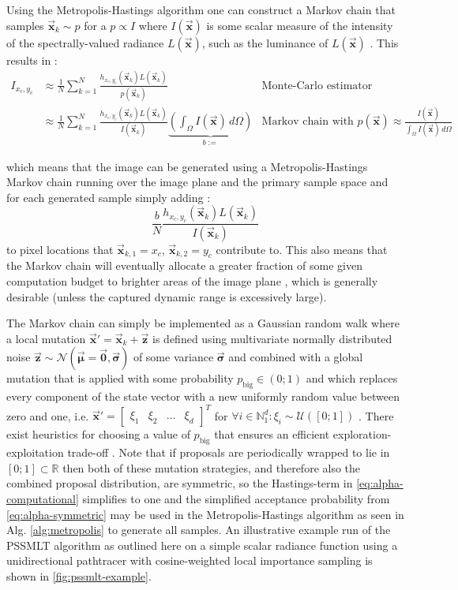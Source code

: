 \documentclass[oneside, a4paper]{article}
\newcommand\vek[1]{\vec{\bm{#1}}}
\newcommand\br[1]{\left(#1\right)}
\begin{document}
Using the Metropolis-Hastings algorithm one can construct a Markov chain that samples $\vek{x}_k \sim p$ for a $p \propto I$ where $I(\vek{x})$ is some scalar measure of the intensity of the spectrally-valued radiance $L\br{\vek{x}}$, such as the luminance of $L(\vek{x})$ \autocite{pbrt}. This results in \autocite{pbrt}:
\begin{align}
  I_{x_c,y_c} &\approx \frac{1}{N}\sum_{k=1}^{N} \frac{h_{x_c,y_c}(\vek{x}_k) L(\vek{x}_k)}{p(\vek{x}_k)}
  &\text{Monte-Carlo estimator}\\
  &\approx \frac{1}{N}\sum_{k=1}^{N} \frac{h_{x_c,y_c}(\vek{x}_k) L(\vek{x}_k)}{I(\vek{x}_k)} \underbrace{\br{\int_\Omega I(\vek{x}) \, d\Omega}}_{b :=}
  &\text{Markov chain with $p\br{\vek{x}}\approx\frac{I(\vek{x})}{\int_\Omega I(\vek{x}) \, d\Omega}$}
\end{align}

which means that the image can be generated using a Metropolis-Hastings Markov chain running over the image plane and the primary sample space and for each generated sample simply adding \autocite{pbrt}:
\begin{equation}\label{eq:pssmlt-contribution}
  \frac{b}{N} \frac{h_{x_c,y_c}(\vek{x}_k) L(\vek{x}_k)}{I(\vek{x}_k)} 
\end{equation}
to pixel locations that $\vek{x}_{k, 1} = x_c$, $\vek{x}_{k, 2} = y_c$ contribute to. This also means that the Markov chain will eventually allocate a greater fraction of some given computation budget to brighter areas of the image plane \autocite{pbrt}, which is generally desirable (unless the captured dynamic range is excessively large).

The Markov chain can simply be implemented as a Gaussian random walk where a local mutation $\vek{x}' = \vek{x}_k + \vek{z}$ is defined using multivariate normally distributed noise $\vek{z}\sim\mathcal{N}\br{\vek{\mu} = \vek{0}, \vek{\sigma}}$ of some variance $\vek{\sigma}$ and combined with a global mutation that is applied with some probability $p_\text{big} \in (0;1)$ and which replaces every component of the state vector with a new uniformly random value between zero and one, i.e. $\vek{x}'=\begin{bmatrix}\xi_1 & \xi_2 & \dots & \xi_d\end{bmatrix}^T$ for $\forall i \in \mathds{N}_1^d: \xi_i \sim \mathcal{U}\br{[0;1]}$ \autocite{pbrt}. There exist heuristics for choosing a value of $p_\text{big}$ that ensures an efficient exploration-exploitation trade-off \autocite{mlt-auto-param}. Note that if proposals are periodically wrapped to lie in $[0;1]\subset \mathds{R}$ then both of these mutation strategies, and therefore also the combined proposal distribution, are symmetric, so the Hastings-term in \autoref{eq:alpha-computational} simplifies to one and the simplified acceptance probability from \autoref{eq:alpha-symmetric} may be used in the Metropolis-Hastings algorithm as seen in Alg. \ref{alg:metropolis} to generate all samples. An illustrative example run of the PSSMLT algorithm as outlined here on a simple scalar radiance function using a unidirectional pathtracer with cosine-weighted local importance sampling is shown in \autoref{fig:pssmlt-example}.
\end{document}
